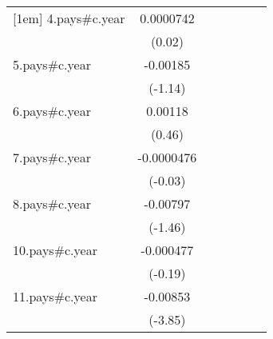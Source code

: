 {\begin{tabular}{l*{6}{c}}
[1em]
4.pays#c.year       &   0.0000742         &                     &                     &                     &                     &                     \\
                    &      (0.02)         &                     &                     &                     &                     &                     \\
[1em]
5.pays#c.year       &    -0.00185         &                     &                     &                     &                     &                     \\
                    &     (-1.14)         &                     &                     &                     &                     &                     \\
[1em]
6.pays#c.year       &     0.00118         &                     &                     &                     &                     &                     \\
                    &      (0.46)         &                     &                     &                     &                     &                     \\
[1em]
7.pays#c.year       &  -0.0000476         &                     &                     &                     &                     &                     \\
                    &     (-0.03)         &                     &                     &                     &                     &                     \\
[1em]
8.pays#c.year       &    -0.00797         &                     &                     &                     &                     &                     \\
                    &     (-1.46)         &                     &                     &                     &                     &                     \\
[1em]
10.pays#c.year      &   -0.000477         &                     &                     &                     &                     &                     \\
                    &     (-0.19)         &                     &                     &                     &                     &                     \\
[1em]
11.pays#c.year      &    -0.00853\sym{***}&                     &                     &                     &                     &                     \\
                    &     (-3.85)         &                     &                     &                     &                     &                     \\

\end{tabular}}
